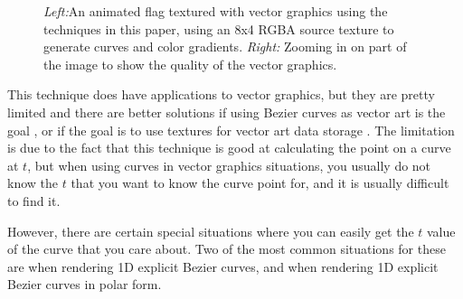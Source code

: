 \documentclass{jcgt}
\begin{document}
  \begin{figure}
    \hspace{-1.5cm}
    \caption{\textit{Left:}An animated flag textured with vector graphics using the techniques in this paper, using an 8x4 RGBA source texture to generate curves and color gradients.  \textit{Right:} Zooming in on part of the image to show the quality of the vector graphics.}   
    \label{fig:vectorgfx}
  \end{figure}

This technique does have applications to vector graphics, but they are pretty limited and there are better solutions if using Bezier curves as vector art is the goal \cite{Loop:2005:RIC:1073204.1073303,Nehab:2008:RRG:1409060.1409088}, or if the goal is to use textures for vector art data storage \cite{Green:2007:IAM:1281500.1281665}.  The limitation is due to the fact that this technique is good at calculating the point on a curve at $t$, but when using curves in vector graphics situations, you usually do not know the $t$ that you want to know the curve point for, and it is usually difficult to find it.

However, there are certain special situations where you can easily get the $t$ value of the curve that you care about.  Two of the most common situations for these are when rendering 1D explicit Bezier curves, and when rendering 1D explicit Bezier curves in polar form.
\end{document}
